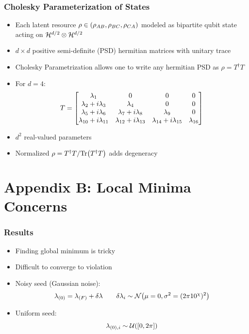 \documentclass[
    hyperref={bookmarks=false},%
    xcolor={dvipsnames},
]{beamer}
\renewcommand{\term}[1]{\textcolor{Mahogany}{#1}}
\begin{document}
\begin{frame}
    \frametitle{Cholesky Parameterization of States}
    \begin{itemize}
        \item Each latent resource $\rho \in \br{\rho_{AB}, \rho_{BC}, \rho_{CA}}$ modeled as bipartite qubit state acting on $\mathcal{H}^{d/2} \otimes \mathcal{H}^{d/2}$
        \item $d \times d$ positive semi-definite (PSD) hermitian matrices with unitary trace
        \item \term{Cholesky Parametrization} allows one to write any hermitian PSD as $\rho = T^{\dagger} T$
        \item For $d = 4$:
        \[ T = \begin{bmatrix}\lambda_{1}&0&0&0\\\lambda_{2} + i \lambda_{3}&\lambda_{4}&0&0\\\lambda_{5} + i \lambda_{6}&\lambda_{7} + i \lambda_{8}&\lambda_{9}&0\\\lambda_{10} + i \lambda_{11}&\lambda_{12} + i \lambda_{13}&\lambda_{14} + i \lambda_{15}&\lambda_{16}\end{bmatrix} \]
        \item $d^2$ real-valued parameters
        \item Normalized $\rho = {T^{\dagger}T}/{\Tr\br{T^{\dagger} T}}$ adds degeneracy
    \end{itemize}
\end{frame}

\section{Appendix B: Local Minima Concerns}

\begin{frame}
    \frametitle{Results}
    \begin{itemize}
        \item Finding global minimum is tricky
        \item Difficult to converge to violation
        \item Noisy seed (Gaussian noise):
        \[ \la_{(0)} = \la_{(F)} + \de \la \qquad \de \la_{i} \sim \s{N}\br{\mu = 0, \si^2 = (2\pi10^{\chi})^2} \]
        \item Uniform seed:
        \[ \la_{(0), i} \sim \s{U}\br{[0, 2\pi]} \]
    \end{itemize}
\end{frame}
\end{document}
